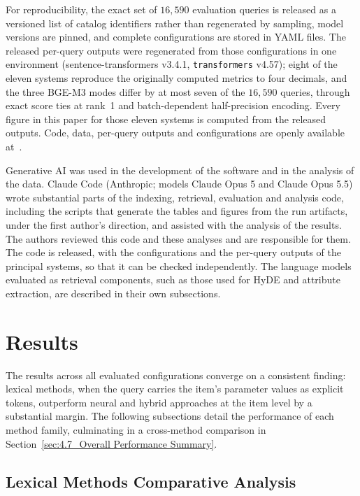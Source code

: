\documentclass[preprint,review,12pt]{elsarticle}
\begin{document}
For reproducibility, the exact set of $16{,}590$ evaluation queries is released as a versioned list of catalog identifiers rather than regenerated by sampling, model versions are pinned, and complete configurations are stored in YAML files. The released per-query outputs were regenerated from those configurations in one environment (sentence-transformers v3.4.1, \texttt{transformers} v4.57); eight of the eleven systems reproduce the originally computed metrics to four decimals, and the three BGE-M3 modes differ by at most seven of the $16{,}590$ queries, through exact score ties at rank~1 and batch-dependent half-precision encoding. Every figure in this paper for those eleven systems is computed from the released outputs. Code, data, per-query outputs and configurations are openly available at~\cite{bc3cat_software,bc3cat_dataset}.

Generative AI was used in the development of the software and in the analysis of the data. Claude Code (Anthropic; models Claude Opus 5 and Claude Opus 5.5) wrote substantial parts of the indexing, retrieval, evaluation and analysis code, including the scripts that generate the tables and figures from the run artifacts, under the first author's direction, and assisted with the analysis of the results. The authors reviewed this code and these analyses and are responsible for them. The code is released, with the configurations and the per-query outputs of the principal systems, so that it can be checked independently. The language models evaluated as retrieval components, such as those used for HyDE and attribute extraction, are described in their own subsections.

\section{Results}
\label{sec:results}
The results across all evaluated configurations converge on a consistent finding: lexical methods, when the query carries the item's parameter values as explicit tokens, outperform neural and hybrid approaches at the item level by a substantial margin. The following subsections detail the performance of each method family, culminating in a cross-method comparison in Section~\ref{sec:4.7_Overall Performance Summary}.

\subsection{Lexical Methods Comparative Analysis}
\label{subsec:lexical_results}
\end{document}

